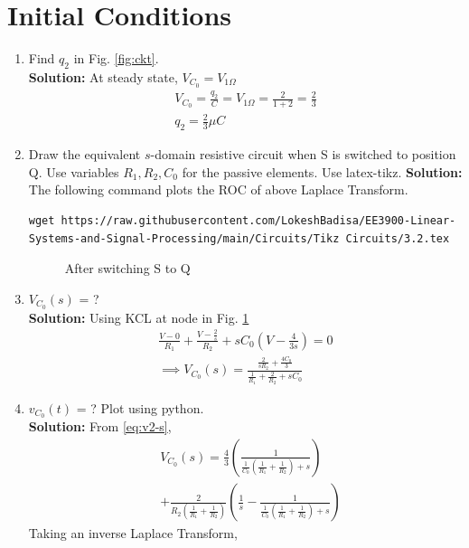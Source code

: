 \documentclass[journal,12pt,twocolumn]{IEEEtran}
\newcommand{\solution}{\noindent \textbf{Solution: }}
\providecommand{\brak}[1]{\ensuremath{\left(#1\right)}}
\numberwithin{equation}{section}
\renewcommand\thesection{\arabic{section}}
\begin{document}
 \section{Initial Conditions}
\begin{enumerate}[label=\arabic*.,ref=\thesection.\theenumi]
\item Find $q_2$ in Fig. 
			\ref{fig:ckt}.\\
			\solution At steady state, $V_{C_0}=V_{1 \Omega}$
			\begin{align*}
			V_{C_0}=\frac{q_2}{C}=V_{1 \Omega}=\frac{2}{1+2}=\frac23\\
			q_2=\frac23 \mu C
			\end{align*}
\item Draw the equivalent $s$-domain resistive circuit when S is switched to position Q.  Use variables $R_1, R_2, C_0$ for the passive elements.
Use latex-tikz.
		\label{prob:init}
		\solution 
		The following command plots the ROC of above Laplace Transform.
	\begin{lstlisting}
wget https://raw.githubusercontent.com/LokeshBadisa/EE3900-Linear-Systems-and-Signal-Processing/main/Circuits/Tikz Circuits/3.2.tex
\end{lstlisting}
	\begin{figure}[!ht]
 \centering
% 
\caption{After switching S to Q}
\label{fig:sq}
\end{figure}
		\item $V_{C_0}(s)$ = ? \\
		\solution Using KCL at node in Fig. \ref{fig:sq}
\begin{align}
    \frac{V - 0}{R_1} + \frac{V - \frac{2}{s}}{R_2} + sC_0\brak{V - \frac{4}{3s}} = 0 \\
\implies V_{C_0}(s) = \frac{\frac{2}{sR_2} + \frac{4C_0}{3}}{\frac{1}{R_1} + \frac{2}{R_2} + sC_0}
\label{eq:v2-s}
\end{align} 
	\item $v_{C_0}(t)$ = ? Plot using python.\\
	\solution From \eqref{eq:v2-s},
\begin{align}
    &V_{C_0}(s) = \frac{4}{3}\brak{\frac{1}{\frac{1}{C_0}\brak{\frac{1}{R_1} + \frac{1}{R_2}}+s}} \nonumber \\
    &+ \frac{2}{R_2\brak{\frac{1}{R_1} +\frac{1}{R_2}}}\brak{\frac{1}{s} - \frac{1}{\frac{1}{C_0}\brak{\frac{1}{R_1} + \frac{1}{R_2}} + s}}
\end{align}
Taking an inverse Laplace Transform,
\begin{align}

\end{align}
\end{enumerate}
\end{document}
